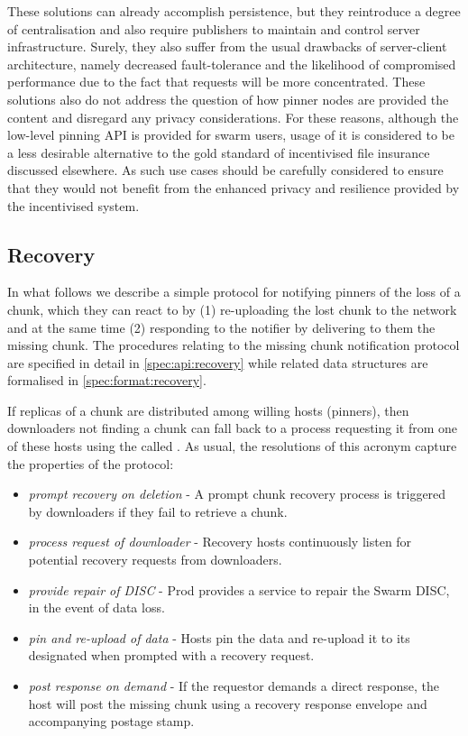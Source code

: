 These solutions can already accomplish persistence, but they reintroduce a degree of centralisation and also require publishers to maintain and control server infrastructure. Surely, they also suffer from the usual drawbacks of server-client architecture, namely decreased fault-tolerance and the likelihood of compromised performance due to the fact that requests will be more concentrated. These solutions also do not address the question of how pinner nodes are provided the content and disregard any privacy considerations. For these reasons, although the low-level pinning API is provided for swarm users, usage of it is considered to be a less desirable alternative to the gold standard of incentivised file insurance discussed elsewhere. As such use cases should be carefully considered to ensure that they would not benefit from the enhanced privacy and resilience provided by the incentivised system.



\subsection{Recovery \statusyellow}\label{sec:recovery-chunks}


In what follows we describe a simple protocol for notifying pinners of the loss of a chunk, which they can react to by (1) re-uploading the lost chunk to the network and at the same time (2) responding to the notifier by delivering to them the missing chunk. The procedures relating to the missing chunk notification protocol are specified in detail in  \ref{spec:api:recovery} while related data structures are formalised in \ref{spec:format:recovery}.

If replicas of a chunk are distributed among willing hosts (pinners), then downloaders not finding a chunk can fall back to a  process requesting it from one of these hosts using the  called .
As usual, the resolutions of this acronym capture the properties of the protocol:

\begin{itemize}
\item \emph{prompt recovery on deletion} - A prompt chunk recovery process is triggered by downloaders if they fail to retrieve a chunk.
\item \emph{process request of downloader} - Recovery hosts continuously listen for potential recovery requests from downloaders.
\item \emph{provide repair of DISC} - 
Prod provides a service to repair the Swarm DISC, in the event of data loss.
\item \emph{pin and re-upload of data} -     
Hosts pin the data and re-upload it to its designated when prompted with a recovery request. 
\item \emph{post response on demand}  - If the requestor demands a direct response, the host will post the missing chunk using a recovery response envelope and accompanying postage stamp.
\end{itemize}

